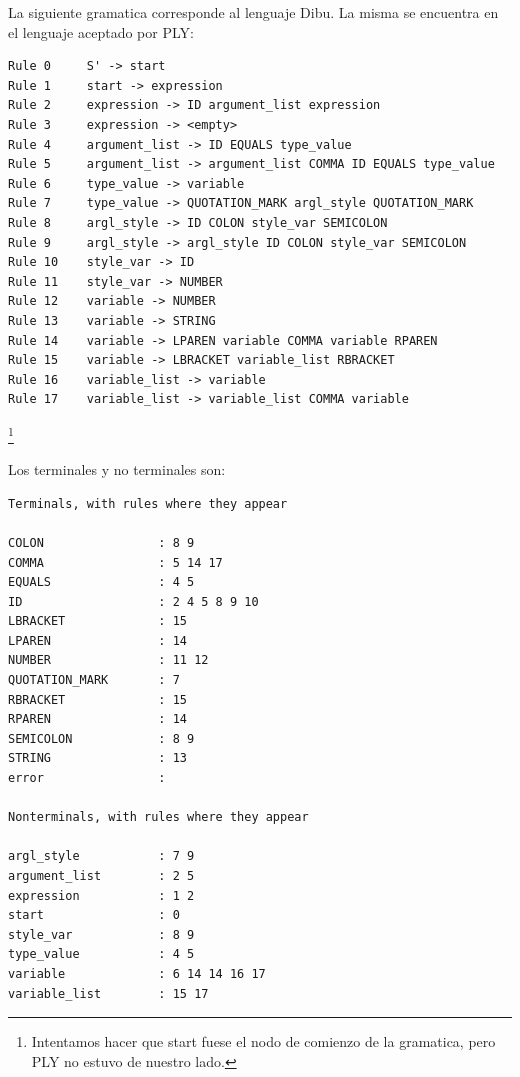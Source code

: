 \documentclass{article}
\theoremstyle{definition}
\theoremstyle{remark}
\begin{document}
La siguiente gramatica corresponde al lenguaje Dibu. La misma se encuentra en el lenguaje aceptado por PLY:

\begin{verbatim}
Rule 0     S' -> start
Rule 1     start -> expression
Rule 2     expression -> ID argument_list expression
Rule 3     expression -> <empty>
Rule 4     argument_list -> ID EQUALS type_value
Rule 5     argument_list -> argument_list COMMA ID EQUALS type_value
Rule 6     type_value -> variable
Rule 7     type_value -> QUOTATION_MARK argl_style QUOTATION_MARK
Rule 8     argl_style -> ID COLON style_var SEMICOLON
Rule 9     argl_style -> argl_style ID COLON style_var SEMICOLON
Rule 10    style_var -> ID
Rule 11    style_var -> NUMBER
Rule 12    variable -> NUMBER
Rule 13    variable -> STRING
Rule 14    variable -> LPAREN variable COMMA variable RPAREN
Rule 15    variable -> LBRACKET variable_list RBRACKET
Rule 16    variable_list -> variable
Rule 17    variable_list -> variable_list COMMA variable
\end{verbatim}
\footnote{Intentamos hacer que start fuese el nodo de comienzo de la gramatica, pero PLY no estuvo de nuestro lado.}

\pagebreak

Los terminales y no terminales son:

\begin{verbatim}
Terminals, with rules where they appear

COLON                : 8 9
COMMA                : 5 14 17
EQUALS               : 4 5
ID                   : 2 4 5 8 9 10
LBRACKET             : 15
LPAREN               : 14
NUMBER               : 11 12
QUOTATION_MARK       : 7
RBRACKET             : 15
RPAREN               : 14
SEMICOLON            : 8 9
STRING               : 13
error                : 

Nonterminals, with rules where they appear

argl_style           : 7 9
argument_list        : 2 5
expression           : 1 2
start                : 0
style_var            : 8 9
type_value           : 4 5
variable             : 6 14 14 16 17
variable_list        : 15 17
\end{verbatim}


%
\end{document}
